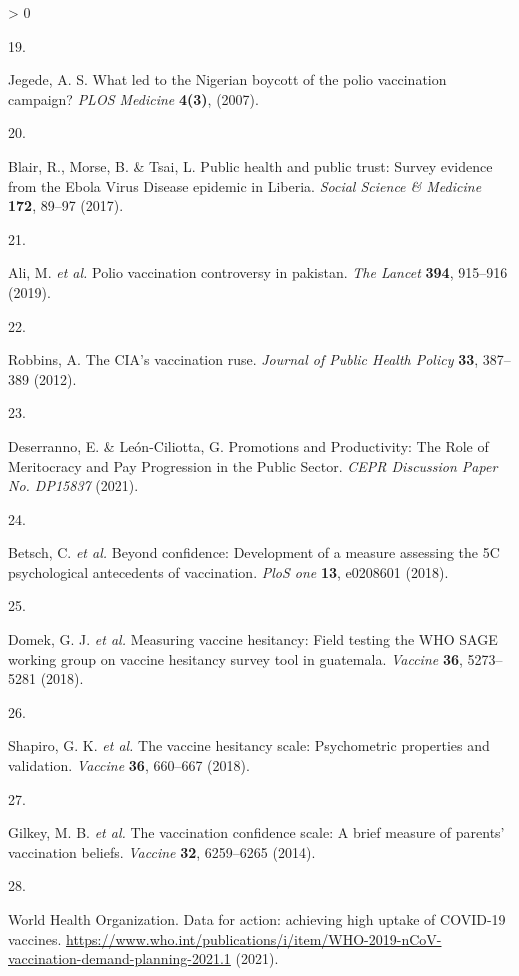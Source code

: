 \documentclass[
  12pt,
]{article}
\newlength{\cslhangindent}
\newlength{\csllabelwidth}
\newenvironment{CSLReferences}[2] %
 {%
  \setlength{\parindent}{0pt}
  \ifodd #1 \everypar{\setlength{\hangindent}{\cslhangindent}}\ignorespaces\fi
  \ifnum #2 > 0
  \setlength{\parskip}{#2\baselineskip}
  \fi
 }%
 {}
\newcommand{\CSLLeftMargin}[1]{\parbox[t]{\csllabelwidth}{#1}}
\newcommand{\CSLRightInline}[1]{\parbox[t]{\linewidth - \csllabelwidth}{#1}\break}
\begin{document}
\begin{CSLReferences}{0}{0}
\leavevmode\hypertarget{ref-Jegede2007}{}%
\CSLLeftMargin{19. }
\CSLRightInline{Jegede, A. S. {What led to the Nigerian boycott of the polio vaccination campaign?} \emph{PLOS Medicine} \textbf{4(3)}, (2007).}

\leavevmode\hypertarget{ref-BLAIR201789}{}%
\CSLLeftMargin{20. }
\CSLRightInline{Blair, R., Morse, B. \& Tsai, L. {Public health and public trust: Survey evidence from the Ebola Virus Disease epidemic in Liberia}. \emph{Social Science \& Medicine} \textbf{172}, 89--97 (2017).}

\leavevmode\hypertarget{ref-ali2019polio}{}%
\CSLLeftMargin{21. }
\CSLRightInline{Ali, M. \emph{et al.} Polio vaccination controversy in pakistan. \emph{The Lancet} \textbf{394}, 915--916 (2019).}

\leavevmode\hypertarget{ref-robbins2012cia}{}%
\CSLLeftMargin{22. }
\CSLRightInline{Robbins, A. The CIA's vaccination ruse. \emph{Journal of Public Health Policy} \textbf{33}, 387--389 (2012).}

\leavevmode\hypertarget{ref-deserrano}{}%
\CSLLeftMargin{23. }
\CSLRightInline{Deserranno, E. \& León-Ciliotta, G. {Promotions and Productivity: The Role of Meritocracy and Pay Progression in the Public Sector}. \emph{CEPR Discussion Paper No. DP15837} (2021).}

\leavevmode\hypertarget{ref-betsch2018beyond}{}%
\CSLLeftMargin{24. }
\CSLRightInline{Betsch, C. \emph{et al.} Beyond confidence: Development of a measure assessing the 5C psychological antecedents of vaccination. \emph{PloS one} \textbf{13}, e0208601 (2018).}

\leavevmode\hypertarget{ref-domek2018measuring}{}%
\CSLLeftMargin{25. }
\CSLRightInline{Domek, G. J. \emph{et al.} Measuring vaccine hesitancy: Field testing the WHO SAGE working group on vaccine hesitancy survey tool in guatemala. \emph{Vaccine} \textbf{36}, 5273--5281 (2018).}

\leavevmode\hypertarget{ref-shapiro2018vaccine}{}%
\CSLLeftMargin{26. }
\CSLRightInline{Shapiro, G. K. \emph{et al.} The vaccine hesitancy scale: Psychometric properties and validation. \emph{Vaccine} \textbf{36}, 660--667 (2018).}

\leavevmode\hypertarget{ref-gilkey2014vaccination}{}%
\CSLLeftMargin{27. }
\CSLRightInline{Gilkey, M. B. \emph{et al.} The vaccination confidence scale: A brief measure of parents' vaccination beliefs. \emph{Vaccine} \textbf{32}, 6259--6265 (2014).}

\leavevmode\hypertarget{ref-whodata}{}%
\CSLLeftMargin{28. }
\CSLRightInline{World Health Organization. {Data for action: achieving high uptake of COVID-19 vaccines}. \url{https://www.who.int/publications/i/item/WHO-2019-nCoV-vaccination-demand-planning-2021.1} (2021).}


\end{CSLReferences}
\end{document}
